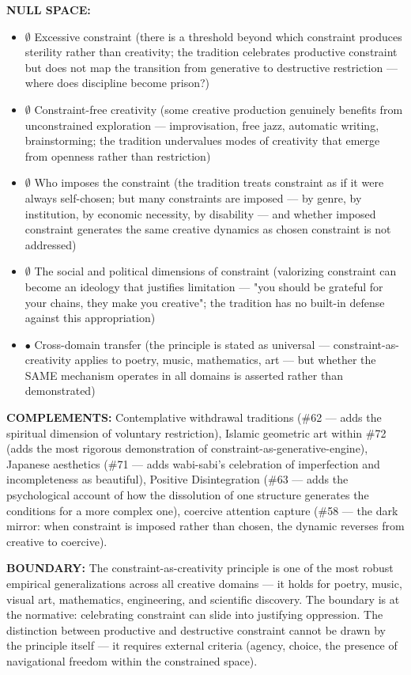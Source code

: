 \textbf{NULL SPACE:}

\begin{itemize}[nosep,leftmargin=*]
  \item $\emptyset$ Excessive constraint (there is a threshold beyond which constraint produces sterility rather than creativity; the tradition celebrates productive constraint but does not map the transition from generative to destructive restriction — where does discipline become prison?)
  \item $\emptyset$ Constraint-free creativity (some creative production genuinely benefits from unconstrained exploration — improvisation, free jazz, automatic writing, brainstorming; the tradition undervalues modes of creativity that emerge from openness rather than restriction)
  \item $\emptyset$ Who imposes the constraint (the tradition treats constraint as if it were always self-chosen; but many constraints are imposed — by genre, by institution, by economic necessity, by disability — and whether imposed constraint generates the same creative dynamics as chosen constraint is not addressed)
  \item $\emptyset$ The social and political dimensions of constraint (valorizing constraint can become an ideology that justifies limitation — "you should be grateful for your chains, they make you creative"; the tradition has no built-in defense against this appropriation)
  \item $\bullet$ Cross-domain transfer (the principle is stated as universal — constraint-as-creativity applies to poetry, music, mathematics, art — but whether the SAME mechanism operates in all domains is asserted rather than demonstrated)
\end{itemize}


\textbf{COMPLEMENTS:} Contemplative withdrawal traditions (\#62 — adds the spiritual dimension of voluntary restriction), Islamic geometric art within \#72 (adds the most rigorous demonstration of constraint-as-generative-engine), Japanese aesthetics (\#71 — adds wabi-sabi's celebration of imperfection and incompleteness as beautiful), Positive Disintegration (\#63 — adds the psychological account of how the dissolution of one structure generates the conditions for a more complex one), coercive attention capture (\#58 — the dark mirror: when constraint is imposed rather than chosen, the dynamic reverses from creative to coercive).


\textbf{BOUNDARY:} The constraint-as-creativity principle is one of the most robust empirical generalizations across all creative domains — it holds for poetry, music, visual art, mathematics, engineering, and scientific discovery. The boundary is at the normative: celebrating constraint can slide into justifying oppression. The distinction between productive and destructive constraint cannot be drawn by the principle itself — it requires external criteria (agency, choice, the presence of navigational freedom within the constrained space).


